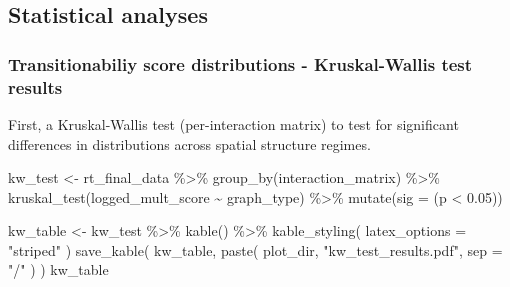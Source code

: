 \documentclass[
]{book}
\newenvironment{Shaded}{\begin{snugshade}}{\end{snugshade}}
\newcommand{\AttributeTok}[1]{\textcolor[rgb]{0.77,0.63,0.00}{#1}}
\newcommand{\FloatTok}[1]{\textcolor[rgb]{0.00,0.00,0.81}{#1}}
\newcommand{\FunctionTok}[1]{\textcolor[rgb]{0.00,0.00,0.00}{#1}}
\newcommand{\NormalTok}[1]{#1}
\newcommand{\OtherTok}[1]{\textcolor[rgb]{0.56,0.35,0.01}{#1}}
\newcommand{\SpecialCharTok}[1]{\textcolor[rgb]{0.00,0.00,0.00}{#1}}
\newcommand{\StringTok}[1]{\textcolor[rgb]{0.31,0.60,0.02}{#1}}
\begin{document}
\hypertarget{statistical-analyses}{%
\subsection{Statistical analyses}\label{statistical-analyses}}

\hypertarget{transitionabiliy-score-distributions---kruskal-wallis-test-results}{%
\subsubsection{Transitionabiliy score distributions - Kruskal-Wallis test results}\label{transitionabiliy-score-distributions---kruskal-wallis-test-results}}

First, a Kruskal-Wallis test (per-interaction matrix) to test for significant differences in distributions across spatial structure regimes.

\begin{Shaded}
\begin{Highlighting}[]
\NormalTok{kw\_test }\OtherTok{\textless{}{-}}\NormalTok{ rt\_final\_data }\SpecialCharTok{\%\textgreater{}\%}
  \FunctionTok{group\_by}\NormalTok{(interaction\_matrix) }\SpecialCharTok{\%\textgreater{}\%}
  \FunctionTok{kruskal\_test}\NormalTok{(logged\_mult\_score }\SpecialCharTok{\textasciitilde{}}\NormalTok{ graph\_type) }\SpecialCharTok{\%\textgreater{}\%}
  \FunctionTok{mutate}\NormalTok{(}\AttributeTok{sig =}\NormalTok{ (p }\SpecialCharTok{\textless{}} \FloatTok{0.05}\NormalTok{))}

\NormalTok{kw\_table }\OtherTok{\textless{}{-}}\NormalTok{ kw\_test }\SpecialCharTok{\%\textgreater{}\%}
  \FunctionTok{kable}\NormalTok{() }\SpecialCharTok{\%\textgreater{}\%}
  \FunctionTok{kable\_styling}\NormalTok{(}
    \AttributeTok{latex\_options =} \StringTok{"striped"}
\NormalTok{  )}
\FunctionTok{save\_kable}\NormalTok{(}
\NormalTok{  kw\_table,}
  \FunctionTok{paste}\NormalTok{(}
\NormalTok{    plot\_dir,}
    \StringTok{"kw\_test\_results.pdf"}\NormalTok{,}
    \AttributeTok{sep =} \StringTok{"/"}
\NormalTok{  )}
\NormalTok{)}
\NormalTok{kw\_table}
\end{Highlighting}
\end{Shaded}
\end{document}
